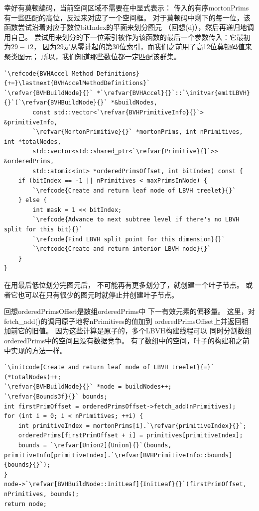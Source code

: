 幸好有莫顿编码，当前空间区域不需要在中显式表示：
传入的有序{\ttfamily mortonPrims}有一些匹配的高位，反过来对应了一个空间框。
对于莫顿码中剩下的每一位，该函数尝试沿着对应于数位{\ttfamily bitIndex}的平面来划分图元
（回想(d)），然后再递归地调用自己。
尝试用来划分的下一位索引被作为该函数的最后一个参数传入：它最初为$29-12$，
因为29是从零计起的第30位索引，而我们之前用了高12位莫顿码值来聚类图元；
所以，我们知道那些数位都一定匹配该群集。
\begin{lstlisting}
`\refcode{BVHAccel Method Definitions}{+=}\lastnext{BVHAccelMethodDefinitions}`
`\refvar{BVHBuildNode}{}` *`\refvar{BVHAccel}{}`::`\initvar{emitLBVH}{}`(`\refvar{BVHBuildNode}{}` *&buildNodes,
        const std::vector<`\refvar{BVHPrimitiveInfo}{}`> &primitiveInfo,
        `\refvar{MortonPrimitive}{}` *mortonPrims, int nPrimitives, int *totalNodes,
        std::vector<std::shared_ptr<`\refvar{Primitive}{}`>> &orderedPrims,
        std::atomic<int> *orderedPrimsOffset, int bitIndex) const {
    if (bitIndex == -1 || nPrimitives < maxPrimsInNode) {
        `\refcode{Create and return leaf node of LBVH treelet}{}`
    } else {
        int mask = 1 << bitIndex;
        `\refcode{Advance to next subtree level if there's no LBVH split for this bit}{}`
        `\refcode{Find LBVH split point for this dimension}{}`
        `\refcode{Create and return interior LBVH node}{}`
    }
}
\end{lstlisting}

在用最后低位划分完图元后，
不可能再有更多划分了，就创建一个叶子节点。
或者它也可以在只有很少的图元时就停止并创建叶子节点。

回想{\ttfamily orderedPrimsOffset}是数组{\ttfamily orderedPrims}中
下一有效元素的偏移量。
这里，对{\ttfamily fetch\_add()}的调用原子地将{\ttfamily nPrimitives}的值加到\newline
{\ttfamily orderedPrimsOffset}上并返回相加前它的旧值。
因为这些计算是原子的，多个LBVH构建线程可以
同时分割数组{\ttfamily orderedPrims}中的空间且没有数据竞争。
有了数组中的空间，叶子的构建和之前中实现的方法一样。
\begin{lstlisting}
`\initcode{Create and return leaf node of LBVH treelet}{=}`
(*totalNodes)++;
`\refvar{BVHBuildNode}{}` *node = buildNodes++;
`\refvar{Bounds3f}{}` bounds;
int firstPrimOffset = orderedPrimsOffset->fetch_add(nPrimitives);
for (int i = 0; i < nPrimitives; ++i) {
    int primitiveIndex = mortonPrims[i].`\refvar{primitiveIndex}{}`;
    orderedPrims[firstPrimOffset + i] = primitives[primitiveIndex];
    bounds = `\refvar[Union2]{Union}{}`(bounds, primitiveInfo[primitiveIndex].`\refvar[BVHPrimitiveInfo::bounds]{bounds}{}`);
}
node->`\refvar[BVHBuildNode::InitLeaf]{InitLeaf}{}`(firstPrimOffset, nPrimitives, bounds);
return node;
\end{lstlisting}

